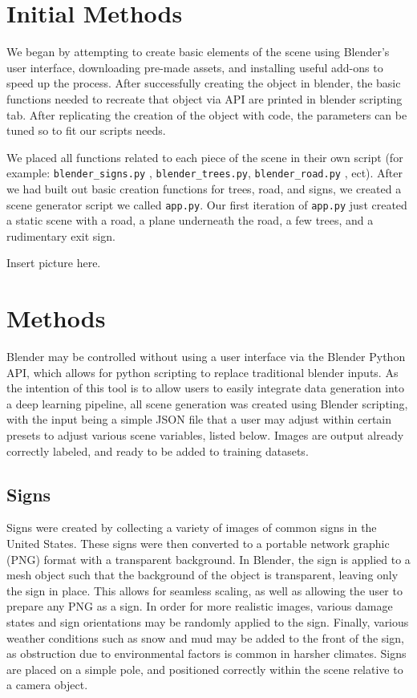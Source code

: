 \documentclass[journal]{IEEEtran}
\begin{document}
 \section{Initial Methods}
 We began by attempting to create basic elements of the scene using Blender's user interface, downloading pre-made assets, and installing useful add-ons to speed up the process. After successfully creating the object in blender, the basic functions needed to recreate that object via API are printed in blender scripting tab. After replicating the creation of the object with code, the parameters can be tuned so to fit our scripts needs. 
 
 We placed all functions related to each piece of the scene in their own script (for example: \texttt{blender\_signs.py}
, \texttt{blender\_trees.py}, \texttt{blender\_road.py}
, ect). After we had built out basic creation functions for trees, road, and signs, we created a scene generator script we called \texttt{app.py}. Our first iteration of \texttt{app.py} just created a static scene with a road, a plane underneath the road, a few trees, and a rudimentary exit sign. 
 
 Insert picture here. 

 \section{Methods}
Blender may be controlled without using a user interface via the Blender Python API, which allows for python scripting to replace traditional blender inputs. As the intention of this tool is to allow users to easily integrate data generation into a deep learning pipeline, all scene generation was created using Blender scripting, with the input being a simple JSON file that a user may adjust within certain presets to adjust various scene variables, listed below. Images are output already correctly labeled, and ready to be added to training datasets. 
\subsection{Signs}
Signs were created by collecting a variety of images of common signs in the United States. These signs were then converted to a portable network graphic (PNG) format with a transparent background. In Blender, the sign is applied to a mesh object such that the background of the object is transparent, leaving only the sign in place. This allows for seamless scaling, as well as allowing the user to prepare any PNG as a sign. In order for more realistic images, various damage states and sign orientations may be randomly applied to the sign. Finally, various weather conditions such as snow and mud may be added to the front of the sign, as obstruction due to environmental factors is common in harsher climates. Signs are placed on a simple pole, and positioned correctly within the scene relative to a camera object. 
\end{document}

